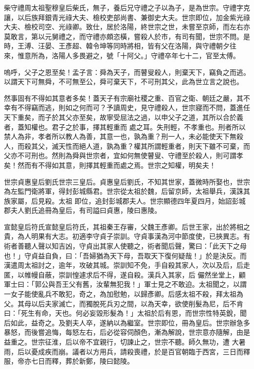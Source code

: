 
\begin{pinyinscope}

 柴守禮周太祖聖穆皇后柴氏，無子，養后兄守禮之子以為子，是為世宗。守禮字克讓，以后族拜銀青光祿大夫、檢校吏部尚書、兼御史大夫。世宗即位，加金紫光祿大夫、檢校司空、光祿卿。致仕，居於洛陽，終世宗之世，未嘗至京師，而左右亦莫敢言，第以元舅禮之，而守禮亦頗恣橫，嘗殺人於市，有司有聞，世宗不問。是時，王溥、汪晏、王彥超、韓令坤等同時將相，皆有父在洛陽，與守禮朝夕往
 來，惟意所為，洛陽人多畏避之，號「十阿父。」守禮卒年七十二，官至太傅。



 嗚呼，父子之恩至矣！孟子言：舜為天子，而瞽叟殺人，則棄天下，竊負之而逃。以謂天下可無舜，不可無至公，舜可棄天下，不可刑其父，此為世立言之說也。



 然事固有不得如其意者多矣！蓋天子有宗廟社稷之重、百官之衛、朝廷之嚴，其不幸有不得竊而逃，則如之何而可？予讀周史，見守禮殺人，世宗寢而不問，蓋進任天下重矣，而子於其父亦至矣，故寧受屈法之過，以申父子之道，其所以合於義者，蓋知權也。君子之於事，擇其輕重而
 處之耳。失刑輕，不孝重也。刑者所以禁人為非，孝者所以教人為善，其意一也，孰為重？刑一人，未必能使天下無殺人，而殺其父，滅天性而絕人道，孰為重？權其所謂輕重者，則天下雖不可棄，而父亦不可刑也。然則為舜與世宗者，宜如何無使瞽叟、守禮至於殺人，則可謂孝矣！然而有不得如其意，則擇其輕重而處之焉。世宗之知權，明矣夫！



 世宗貞惠皇后劉氏世宗三皇后。貞惠皇后劉氏，不知其世家，蓋微時所娶也，世宗為左監門衛將軍，得封彭城縣君。世宗從太祖於魏，后留京師，太祖舉兵，漢誅其族家屬，后見殺。太祖
 即位，追封彭城郡夫人。世宗顯德四年夏四月，始詔彭城郡夫人劉氏追冊為皇后，有司謚曰貞惠，陵曰惠陵。



 宣懿皇后符氏宣懿皇后符氏，其祖秦王存審，父魏王彥卿。后世王家，出於將相之貴，為人明果有大志。初適李守貞子崇訓。守貞事漢為河中節度使，已挾異志。有術者善聽人聲以知吉凶，守貞出其家人使聽之，術者聞后聲，驚曰：「此天下之母也！」守貞益自負，曰：「吾婦猶為天下母，吾取天下復何疑哉！」於是決反。而漢遣周太祖討之，逾年，攻破其城。崇訓知不免，手自殺其家人，次以及后，后走匿，以帷幔自蔽，崇訓惶遽求后不得，遂自殺。漢兵入其家，后
 儼然坐堂上，顧軍士曰：「郭公與吾王父有舊，汝輩無犯我！」軍士見之不敢迫。太祖聞之，以謂一女子能使亂兵不敢犯，奇之，為加慰勉，以歸彥卿。后感太祖不殺，拜太祖為父。其母以后夫家滅亡，而獨脫死兵刃之間，以為天幸，欲使削髮為尼，后不肯曰：「死生有命，天也。何必妄毀形髮為！」太祖於后有恩，而世宗性特英銳，聞后如此，益奇之。及劉夫人卒，遂納以為繼室。世宗即位，冊為皇后。世宗辦急多暴怒，而後嘗追悔，每怒左右，后必從容伺顏色，漸為解說，世宗意亦隨解，由是益重之。世宗征淮，后以帝不宜親行，切諫止之，世宗不聽。師久無功，遭
 大暑雨，后以憂成疾而崩。議者以方用兵，請殺喪禮，於是百官朝臨于西宮，三日而釋服，帝亦七日而釋，葬於新鄭，陵曰懿陵。




\end{pinyinscope}
